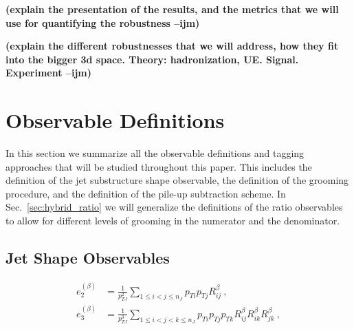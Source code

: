 \documentclass[11pt,letterpaper]{article}
\DeclareRobustCommand{\Sec}[1]{Sec.~\ref{#1}}
\newcommand{\ecf}[2]{e_{#1}^{(#2)}}
\newcommand{\ijm}[1]{\textbf{\textcolor{llblue}{(#1 --ijm)}}}
\begin{document}
\ijm{explain the presentation of the results, and the metrics that we will use for quantifying the robustness}

\ijm{explain the different robustnesses that we will address, how they fit into the bigger 3d space.
Theory: hadronization, UE. Signal. Experiment}



\section{Observable Definitions}

In this section we summarize all the observable definitions and tagging approaches that will be studied throughout this paper. This includes the definition of the jet substructure shape observable, the definition of the grooming procedure, and the definition of the pile-up subtraction scheme. In \Sec{sec:hybrid_ratio} we will generalize the definitions of the ratio observables to allow for different levels of grooming in the numerator and the denominator.



\subsection{Jet Shape Observables}





\cite{Moult:2016cvt}

\begin{align}
\ecf{2}{\beta} &= \frac{1}{p_{TJ}^2}\sum_{1\leq i<j\leq n_J} p_{Ti}p_{Tj} R_{ij}^\beta \ ,\nonumber \\
\ecf{3}{\beta} &= \frac{1}{p_{TJ}^3}\sum_{1\leq i<j<k\leq n_J} p_{Ti}p_{Tj}p_{Tk} R_{ij}^\beta R_{ik}^\beta R_{jk}^\beta \ , \nonumber \\
\end{align}
\end{document}
